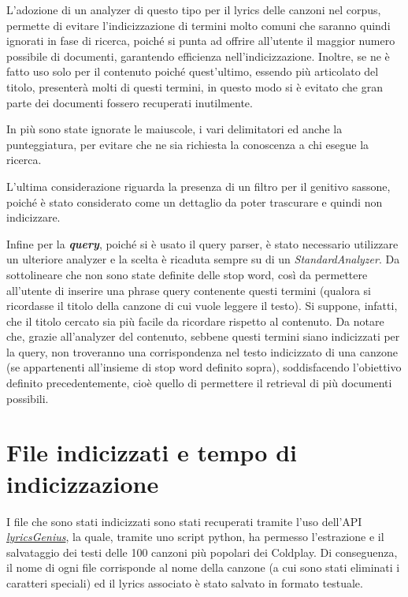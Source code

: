 \documentclass{article}
\begin{document}
L'adozione di un analyzer di questo tipo per il lyrics delle canzoni nel corpus, permette di evitare l'indicizzazione di termini molto comuni che saranno quindi ignorati in fase di ricerca, poiché si punta ad offrire all'utente il maggior numero possibile di documenti, garantendo efficienza nell'indicizzazione. Inoltre, se ne è fatto uso solo per il contenuto poiché quest'ultimo, essendo più articolato del titolo, presenterà molti di questi termini, in questo modo si è evitato che gran parte dei documenti fossero recuperati inutilmente.

In più sono state ignorate le maiuscole, i vari delimitatori ed anche la punteggiatura, per evitare che ne sia richiesta la conoscenza a chi esegue la ricerca. 

L'ultima considerazione riguarda la presenza di un filtro per il genitivo sassone, poiché è stato considerato come un dettaglio da poter trascurare e quindi non indicizzare.

Infine per la \textbf{\textit{query}}, poiché si è usato il query parser, è stato necessario utilizzare un ulteriore analyzer e la scelta è ricaduta sempre su di un \textit{StandardAnalyzer}.
Da sottolineare che non sono state definite delle stop word, così da permettere all'utente di inserire una phrase query contenente questi termini (qualora si ricordasse il titolo della canzone di cui vuole leggere il testo). Si suppone, infatti, che il titolo cercato sia più facile da ricordare rispetto al contenuto. Da notare che, grazie all'analyzer del contenuto, sebbene questi termini siano indicizzati per la query, non troveranno una corrispondenza nel testo indicizzato di una canzone (se appartenenti all'insieme di stop word definito sopra), soddisfacendo l'obiettivo definito precedentemente, cioè quello di permettere il retrieval di più documenti possibili.

\section{File indicizzati e tempo di indicizzazione}
I file che sono stati indicizzati sono stati recuperati tramite l'uso dell'API \href{https://lyricsgenius.readthedocs.io/en/master/}{\textit{lyricsGenius}}, la quale, tramite uno script python, ha permesso l'estrazione e il salvataggio dei testi delle 100 canzoni più popolari dei Coldplay. Di conseguenza, il nome di ogni file corrisponde al nome della canzone (a cui sono stati eliminati i caratteri speciali) ed il lyrics associato è stato salvato in formato testuale.
\end{document}
